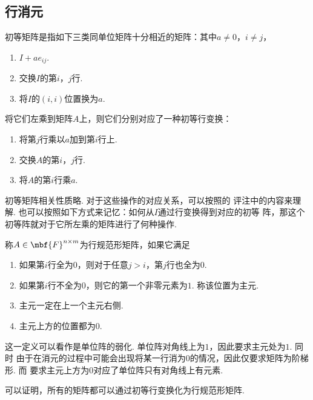\subsection{行消元}

  \begin{defi}
    初等矩阵是指如下三类同单位矩阵十分相近的矩阵：其中$a\ne0$，$i\ne j$，
    \begin{enumerate}
      \item $I+ae_{ij}$.
      \item 交换$I$的第$i$，$j$行.
      \item 将$I$的$(i, i)$位置换为$a$.
    \end{enumerate}
    将它们左乘到矩阵$A$上，则它们分别对应了一种初等行变换：
    \begin{enumerate}
      \item 将第$j$行乘以$a$加到第$i$行上.
      \item 交换$A$的第$i$，$j$行.
      \item 将$A$的第$i$行乘$a$.
    \end{enumerate}
  \end{defi}
  \remark
    初等矩阵相关性质略. 对于这些操作的对应关系，可以按照的
    评注中的内容来理解. 也可以按照如下方式来记忆：如何从$I$通过行变换得到对应的初等
    阵，那这个初等阵就对于它所左乘的矩阵进行了何种操作.

  \begin{defi}
    称$A\in\mbf{F}^{n\times m}$为行规范形矩阵，如果它满足
    \begin{enumerate}
      \item 如果第$i$行全为$0$，则对于任意$j>i$，第$j$行也全为$0$.
      \item 如果第$i$行不全为$0$，则它的第一个非零元素为$1$. 称该位置为主元.
      \item 主元一定在上一个主元右侧.
      \item 主元上方的位置都为$0$.
    \end{enumerate}
  \end{defi}
  \remark
    这一定义可以看作是单位阵的弱化. 单位阵对角线上为$1$，因此要求主元处为$1$. 同时
    由于在消元的过程中可能会出现将某一行消为$0$的情况，因此仅要求矩阵为阶梯形. 而
    要求主元上方为$0$对应了单位阵只有对角线上有元素.\par
    可以证明，所有的矩阵都可以通过初等行变换化为行规范形矩阵.

